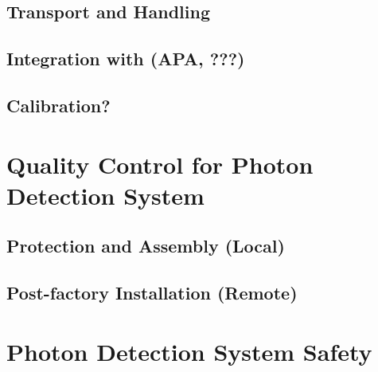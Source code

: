 \subsection{Transport and Handling}
\label{sec:fddp-pd-install-transport}


\subsection{Integration with (APA, ???)}
\label{sec:fddp-pd-install-pd-???}


\subsection{Calibration?}
\label{sec:fddp-pd-install-calib}



\section{Quality Control for Photon Detection System}
\label{sec:fddp-pd-qc}

\subsection{Protection and Assembly (Local)}
\label{sec:fddp-pd-qc-local}


\subsection{Post-factory Installation (Remote)}
\label{sec:fddp-pd-qc-remote}





\section{Photon Detection System Safety}
\label{sec:fddp-pd-safety}



